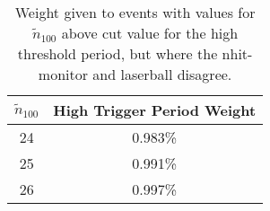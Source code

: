 \begin{table}
    \centering
    \begin{tabular}{c| c}
        $\tilde{n}_{100}$ & High Trigger Period Weight\\
        \hline
        24 & 0.983\% \\
        25 & 0.991\%\\
        26 & 0.997\%\\
        \end{tabular}
        \caption[Solar Analysis Trigger Efficiecy Systmatics]{
            Weight given to events with values for $\tilde{n}_{100}$ above
            cut value for the high threshold period, but where the nhit-monitor and laserball disagree.}
        \label{tbl:trigg_eff}
\end{table}
